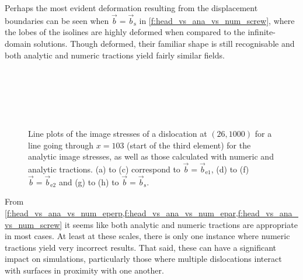 Perhaps the most evident deformation resulting from the displacement boundaries can be seen when $\vec{b} = \vec{b}_{\textrm{s}}$ in \cref{f:head_vs_ana_vs_num_screw}, where the lobes of the isolines are highly deformed when compared to the infinite-domain solutions. Though deformed, their familiar shape is still recognisable and both analytic and numeric tractions yield fairly similar fields.

\begin{figure}
    \centering
    ~
    ~

    ~
    ~

    ~
    \caption[Line plots of the infinite domain, analytic and traction image stresses.]{Line plots of the image stresses of a dislocation at $(26, 1000)$ for a line going through $x = 103$ (start of the third element) for the analytic image stresses, as well as those calculated with numeric and analytic tractions. (a) to (c) correspond to $\vec{b} = \vec{b}_{\textrm{e1}}$, (d) to (f) $\vec{b} = \vec{b}_{\textrm{e2}}$ and (g) to (h) to $\vec{b} = \vec{b}_{\textrm{s}}$.}
    \label{f:line_head_vs_ana_vs_num}
\end{figure}
From \cref{f:head_vs_ana_vs_num_eperp,f:head_vs_ana_vs_num_epar,f:head_vs_ana_vs_num_screw} it seems like both analytic and numeric tractions are appropriate in most cases. At least at these scales, there is only one instance where numeric tractions yield very incorrect results. That said, these can have a significant impact on simulations, particularly those where multiple dislocations interact with surfaces in proximity with one another.

